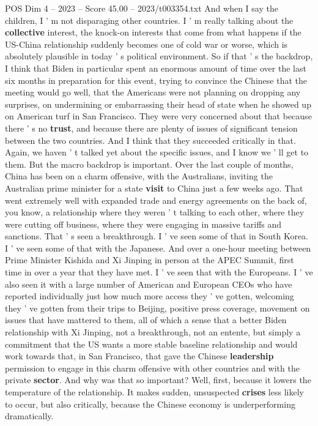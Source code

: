 \begin{textsample}{POS Dim 4 – 2023 – Score 45.00 – 2023/t003354.txt}
And when I say the children, I ' m not disparaging other countries.
I ' m really talking about the \textbf{collective} interest, the knock-on interests that come from what happens if the US-China relationship suddenly becomes one of cold war or worse, which is absolutely plausible in today ' s political environment.
So if that ' s the backdrop, I think that Biden in particular spent an enormous amount of time over the last six months in preparation for this event, trying to convince the Chinese that the meeting would go well, that the Americans were not planning on dropping any surprises, on undermining or embarrassing their head of state when he showed up on American turf in San Francisco.
They were very concerned about that because there ' s no \textbf{trust}, and because there are plenty of issues of significant tension between the two countries.
And I think that they succeeded critically in that.
Again, we haven ' t talked yet about the specific issues, and I know we ' ll get to them.
But the macro backdrop is important.
Over the last couple of months, China has been on a charm offensive, with the Australians, inviting the Australian prime minister for a state \textbf{visit} to China just a few weeks ago.
That went extremely well with expanded trade and energy agreements on the back of, you know, a relationship where they weren ' t talking to each other, where they were cutting off business, where they were engaging in massive tariffs and sanctions.
That ' s seen a breakthrough.
I ' ve seen some of that in South Korea.
I ' ve seen some of that with the Japanese.
And over a one-hour meeting between Prime Minister Kishida and Xi Jinping in person at the APEC Summit, first time in over a year that they have met.
I ' ve seen that with the Europeans.
I ' ve also seen it with a large number of American and European CEOs who have reported individually just how much more access they ' ve gotten, welcoming they ' ve gotten from their trips to Beijing, positive press coverage, movement on issues that have mattered to them, all of which a sense that a better Biden relationship with Xi Jinping, not a breakthrough, not an entente, but simply a commitment that the US wants a more stable baseline relationship and would work towards that, in San Francisco, that gave the Chinese \textbf{leadership} permission to engage in this charm offensive with other countries and with the private \textbf{sector}.
And why was that so important?
Well, first, because it lowers the temperature of the relationship.
It makes sudden, unsuspected \textbf{crises} less likely to occur, but also critically, because the Chinese economy is underperforming dramatically.

\end{textsample}
